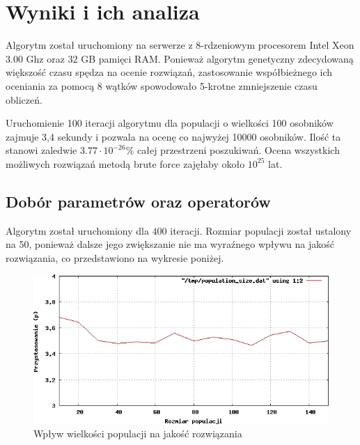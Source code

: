 \documentclass[brudnopis]{xmgr}
\begin{document}
\chapter{Wyniki i ich analiza}

Algorytm został uruchomiony na serwerze z 8-rdzeniowym procesorem Intel Xeon 3.00 Ghz oraz 32 GB pamięci RAM. Ponieważ algorytm genetyczny zdecydowaną większość czasu spędza na ocenie rozwiązań, zastosowanie współbieżnego ich oceniania za pomocą 8 wątków spowodowało 5-krotne zmniejszenie czasu obliczeń.

Uruchomienie 100 iteracji algorytmu dla populacji o wielkości 100 osobników zajmuje 3,4 sekundy i pozwala na ocenę co najwyżej 10000 osobników. Ilość ta stanowi zaledwie $ 3.77 \cdot 10^{-26} \% $ całej przestrzeni poszukiwań. Ocena wszystkich możliwych rozwiązań metodą brute force zajęłaby około $ 10^{25} $ lat.

\section{Dobór parametrów oraz operatorów}

Algorytm został uruchomiony dla $400$ iteracji. Rozmiar populacji został ustalony na 50, ponieważ dalsze jego zwiększanie nie ma wyraźnego wpływu na jakość rozwiązania, co przedstawiono na wykresie poniżej.
\begin{figure}[!tbh]
\centering
\includegraphics[width=.8\hsize]{fig/population_size}
\caption{Wpływ wielkości populacji na jakość rozwiązania}
\end{figure}
\end{document}
